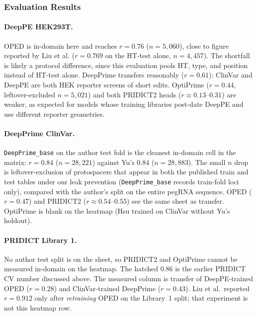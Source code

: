 \documentclass{article}
\begin{document}
\subsubsection{Evaluation Results}

\paragraph{DeepPE HEK293T.}
OPED is in-domain here and reaches $r = 0.76$ ($n = 5{,}060$), close to figure reported by Liu et al. ($r = 0.769$ on the HT-test alone, $n = 4{,}457$)\cite{liuDesignPrimeeditingGuide2023}. The shortfall is likely a protocol difference, since this evaluation pools HT, type, and position instead of HT-test alone. DeepPrime transfers reasonably ($r = 0.61$): ClinVar and DeepPE are both HEK reporter screens of short edits. OptiPrime ($r = 0.44$, leftover-excluded $n = 5{,}021$) and both PRIDICT2 heads ($r \approx 0.13$--$0.31$) are weaker, as expected for models whose training libraries post-date DeepPE and use different reporter geometries.

\paragraph{DeepPrime ClinVar.}
\nolinkurl{DeepPrime\_base} on the author test fold is the cleanest in-domain cell in the matrix: $r = 0.84$ ($n = 28{,}221$) against Yu's $0.84$ ($n = 28{,}883$)\cite{yuPredictionEfficienciesDiverse2023}. The small $n$ drop is leftover-exclusion of protospacers that appear in both the published train and test tables under our leak prevention (\nolinkurl{DeepPrime\_base} records train-fold loci only), compared with the author's split on the entire pegRNA sequence. OPED ($r = 0.47$) and PRIDICT2 ($r \approx 0.54$--$0.55$) see the same sheet as transfer. OptiPrime is blank on the heatmap (Hsu trained on ClinVar without Yu's holdout).

\paragraph{PRIDICT Library 1.}
No author test split is on the sheet, so PRIDICT2 and OptiPrime cannot be measured in-domain on the heatmap. The hatched $0.86$ is the earlier PRIDICT CV number discussed above. The measured column is transfer of DeepPE-trained OPED ($r = 0.28$) and ClinVar-trained DeepPrime ($r = 0.43$). Liu et al.\ reported $r = 0.912$ only after \emph{retraining} OPED on the Library~1 split\cite{liuDesignPrimeeditingGuide2023}; that experiment is not this heatmap row.
\end{document}

